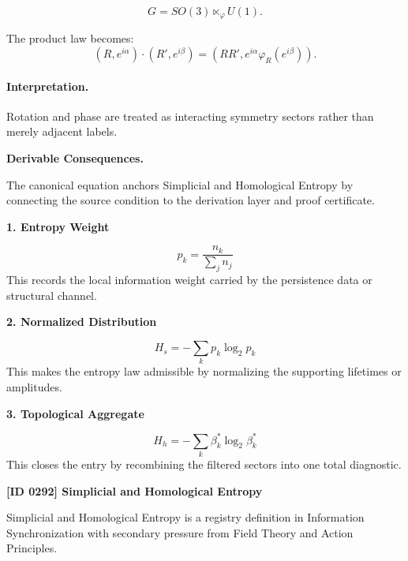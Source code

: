 \begin{equation}
G=SO(3)\ltimes_{\varphi}U(1).
\end{equation}

The product law becomes:
\begin{equation}
\boxed{
(R,e^{i\alpha})\cdot(R',e^{i\beta})
=
\left(
RR',
e^{i\alpha}\varphi_R(e^{i\beta})
\right).
}
\end{equation}

\paragraph{Interpretation.}
Rotation and phase are treated as interacting symmetry sectors rather than merely adjacent labels.

\par\vspace{0.35em}
\noindent\textbf{Derivable Consequences.}\quad
\begingroup
\footnotesize
\raggedright
The canonical equation anchors Simplicial and Homological Entropy by connecting the source condition to the derivation layer and proof certificate.
\par\endgroup

\noindent\textbf{1. Entropy Weight}\par
\[
p_k=\frac{n_k}{\sum_j n_j}
\]
\noindent This records the local information weight carried by the persistence data or structural channel.\par
\noindent\textbf{2. Normalized Distribution}\par
\[
H_s=-\sum_k p_k\log_2 p_k
\]
\noindent This makes the entropy law admissible by normalizing the supporting lifetimes or amplitudes.\par
\noindent\textbf{3. Topological Aggregate}\par
\[
H_h=-\sum_k \beta_k^{\ast}\log_2\beta_k^{\ast}
\]
\noindent This closes the entry by recombining the filtered sectors into one total diagnostic.\par

\clearpage
\noindent\textbf{[ID 0292] Simplicial and Homological Entropy}\par
\vspace{0.35em}
\begingroup\small
{}
Simplicial and Homological Entropy is a registry definition in Information Synchronization with secondary pressure from Field Theory and Action Principles.

